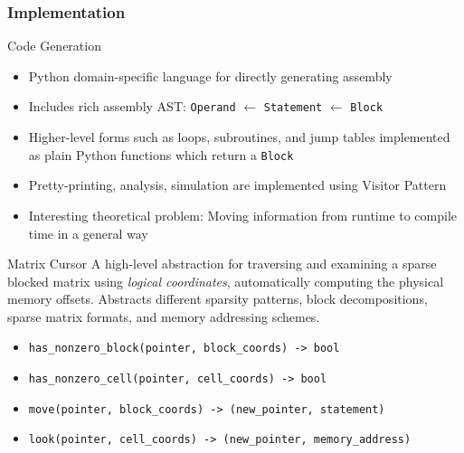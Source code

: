 \documentclass[9pt]{beamer}
\begin{document}
\begin{frame}[fragile]
  \frametitle{Implementation}

  \begin{block}{Code Generation}
    \begin{itemize}
    \item Python domain-specific language for directly generating assembly
    \item Includes rich assembly AST: \texttt{Operand} $\leftarrow$ \texttt{Statement} $\leftarrow$ \texttt{Block} 
    \item Higher-level forms such as loops, subroutines, and jump tables
          implemented as plain Python functions which return a \texttt{Block}
    \item Pretty-printing, analysis, simulation are implemented using Visitor Pattern
    \item Interesting theoretical problem: Moving information from runtime to compile time in a general way
    \end{itemize}
  \end{block}



  \begin{block}{Matrix Cursor}
    A high-level abstraction for traversing and examining a sparse blocked matrix using \emph{logical coordinates}, automatically computing the physical memory offsets. Abstracts different sparsity patterns, block decompositions, sparse matrix formats, and memory addressing schemes.
    \begin{itemize}
    \item \verb|has_nonzero_block(pointer, block_coords) -> bool|
    \item \verb|has_nonzero_cell(pointer, cell_coords) -> bool|
    \item \verb|move(pointer, block_coords) -> (new_pointer, statement)|
    \item \verb|look(pointer, cell_coords) -> (new_pointer, memory_address)|
    \end{itemize}
    \end{block}
\end{frame}
\end{document}

